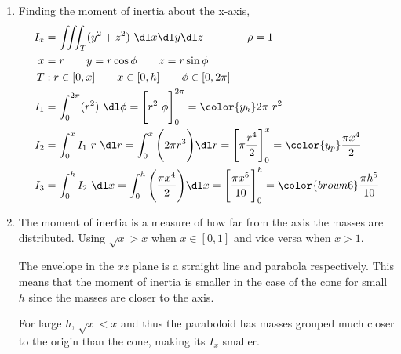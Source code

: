 \begin{enumerate}
     \item Finding the moment of inertia about the x-axis,
           \begin{align}
                I_x & = \iiint_T (y^2 + z^2)\ \dl x \dl y \dl z \qquad\qquad \rho = 1 \\
                x   & = r \qquad y = r \cos \phi \qquad z = r \sin \phi               \\
                T   & : r \in [0, x] \qquad x \in [0, h]
                \qquad \phi \in [0, 2\pi]                                             \\
                I_1 & = \int_{0}^{2\pi} (r^2) \ \dl \phi
                = \Bigg[ r^2\ \phi \Bigg]_{0}^{2\pi}
                = {\color{y_h} 2\pi\ r^2}                                             \\
                I_2 & = \int_{0}^{x} I_1 \ r\ \dl r
                = \int_{0}^{x} \Bigg( 2\pi r^3 \Bigg) \dl r
                = \Bigg[ \pi \frac{r^4}{2} \Bigg]_{0}^{x}
                = {\color{y_p} \frac{\pi x^4}{2} }                                    \\
                I_3 & = \int_{0}^{h} I_2\ \dl x = \int_{0}^{h}
                \Bigg( \frac{\pi x^4}{2} \Bigg) \dl x
                = \Bigg[ \frac{\pi x^5}{10} \Bigg]_{0}^{h}
                = {\color{brown6} \frac{\pi h^5}{10}}
           \end{align}

     \item The moment of inertia is a measure of how far from the axis the masses
           are distributed. Using $ \sqrt{x} > x $ when $ x \in [0, 1] $ and
           vice versa when $ x > 1 $. \par

           The envelope in the $ xz $ plane is a straight line and parabola respectively.
           This means that the moment of inertia is smaller in the case of the cone
           for small $ h $ since the masses are closer to the axis. \par

           For large $ h $, $ \sqrt{x} < x $ and thus the paraboloid has masses grouped
           much closer to the origin than the cone, making its $ I_x $ smaller.


\end{enumerate}

